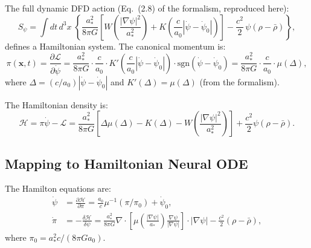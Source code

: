 \documentclass[11pt]{article}
\theoremstyle{definition}
\theoremstyle{remark}
\begin{document}
The full dynamic DFD action (Eq.~(2.8) of the formalism, reproduced here):
\begin{equation}
  S_\psi = \int dt\,d^3x\;\left\{
  \frac{a_*^2}{8\pi G}\left[
    W\!\left(\frac{|\nabla\psi|^2}{a_*^2}\right)
    + K\!\left(\frac{c}{a_0}|\dot\psi - \dot\psi_0|\right)
  \right]
  - \frac{c^2}{2}\,\psi(\rho - \bar\rho)
  \right\},
  \label{eq:dfd-action-full}
\end{equation}
defines a Hamiltonian system. The canonical momentum is:
\begin{equation}
  \pi(\mathbf{x}, t) = \frac{\partial \mathcal{L}}{\partial \dot\psi}
  = \frac{a_*^2}{8\pi G} \cdot \frac{c}{a_0} \cdot K'\!\left(\frac{c}{a_0}|\dot\psi - \dot\psi_0|\right)
  \cdot \text{sgn}(\dot\psi - \dot\psi_0)
  = \frac{a_*^2}{8\pi G} \cdot \frac{c}{a_0} \cdot \mu(\Delta),
  \label{eq:canonical-momentum}
\end{equation}
where $\Delta = (c/a_0)|\dot\psi - \dot\psi_0|$ and $K'(\Delta) = \mu(\Delta)$
(from the formalism).

The Hamiltonian density is:
\begin{equation}
  \mathcal{H} = \pi\dot\psi - \mathcal{L}
  = \frac{a_*^2}{8\pi G}\left[\Delta\mu(\Delta) - K(\Delta)
  - W\!\left(\frac{|\nabla\psi|^2}{a_*^2}\right)\right]
  + \frac{c^2}{2}\psi(\rho - \bar\rho).
  \label{eq:hamiltonian-density}
\end{equation}

\subsection{Mapping to Hamiltonian Neural ODE}
\label{sec:hnn-mapping}

The Hamilton equations are:
\begin{align}
  \dot\psi &= \frac{\partial \mathcal{H}}{\partial \pi}
  = \frac{a_0}{c}\mu^{-1}(\pi/\pi_0) + \dot\psi_0, \label{eq:hamilton-psi} \\
  \dot\pi &= -\frac{\delta \mathcal{H}}{\delta \psi}
  = \frac{a_*^2}{8\pi G}\nabla\cdot\!\left[\mu\!\left(\frac{|\nabla\psi|}{a_*}\right)
  \frac{\nabla\psi}{|\nabla\psi|}\right] \cdot |\nabla\psi|
  - \frac{c^2}{2}(\rho - \bar\rho), \label{eq:hamilton-pi}
\end{align}
where $\pi_0 = a_*^2 c/(8\pi G a_0)$.
\end{document}
